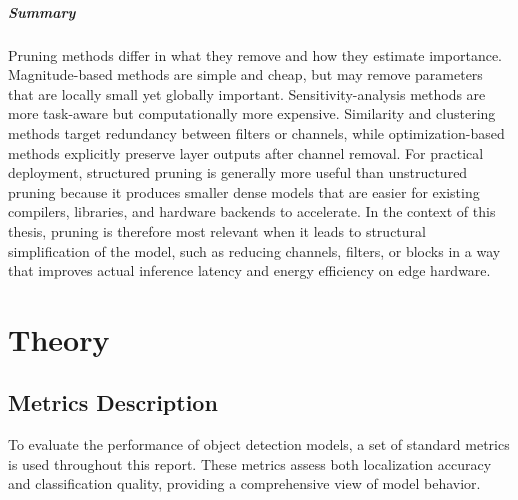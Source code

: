 \documentclass[12pt,a4paper]{report}
\begin{document}
\paragraph{Summary}
Pruning methods differ in what they remove and how they estimate importance. Magnitude-based
methods are simple and cheap, but may remove parameters that are locally small yet globally
important. Sensitivity-analysis methods are more task-aware but computationally more expensive.
Similarity and clustering methods target redundancy between filters or channels, while
optimization-based methods explicitly preserve layer outputs after channel removal. For practical
deployment, structured pruning is generally more useful than unstructured pruning because it
produces smaller dense models that are easier for existing compilers, libraries, and hardware
backends to accelerate. In the context of this thesis, pruning is therefore most relevant when it
leads to structural simplification of the model, such as reducing channels, filters, or blocks in a
way that improves actual inference latency and energy efficiency on edge hardware.

\chapter{Theory}
\label{chap:literature}

\section{Metrics Description}


To evaluate the performance of object detection models, a set of standard metrics is used throughout this report.
These metrics assess both localization accuracy and classification quality, providing a comprehensive view of
model behavior.
\end{document}
